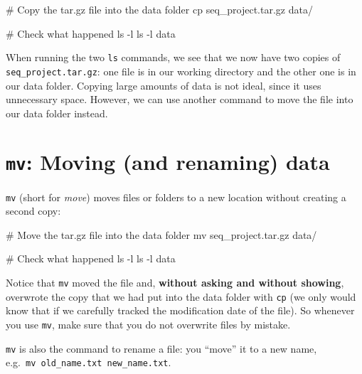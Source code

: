 \documentclass[
  letterpaper,
  DIV=11,
  numbers=noendperiod]{scrreprt}
\newenvironment{Shaded}{}{}
\newcommand{\AttributeTok}[1]{\textcolor[rgb]{0.84,0.23,0.29}{#1}}
\newcommand{\CommentTok}[1]{\textcolor[rgb]{0.42,0.45,0.49}{#1}}
\newcommand{\FunctionTok}[1]{\textcolor[rgb]{0.44,0.26,0.76}{#1}}
\newcommand{\NormalTok}[1]{\textcolor[rgb]{0.14,0.16,0.18}{#1}}
\begin{document}
\begin{Shaded}
\begin{Highlighting}[]
\CommentTok{\# Copy the tar.gz file into the data folder}
\FunctionTok{cp}\NormalTok{ seq\_project.tar.gz data/}

\CommentTok{\# Check what happened}
\FunctionTok{ls} \AttributeTok{{-}l}
\FunctionTok{ls} \AttributeTok{{-}l}\NormalTok{ data}
\end{Highlighting}
\end{Shaded}

When running the two \texttt{ls} commands, we see that we now have two
copies of \texttt{seq\_project.tar.gz}: one file is in our working
directory and the other one is in our data folder. Copying large amounts
of data is not ideal, since it uses unnecessary space. However, we can
use another command to move the file into our data folder instead.

\section{\texorpdfstring{\texttt{mv}: Moving (and renaming)
data}{mv: Moving (and renaming) data}}\label{mv-moving-and-renaming-data}

\texttt{mv} (short for \emph{move}) moves files or folders to a new
location without creating a second copy:

\begin{Shaded}
\begin{Highlighting}[]
\CommentTok{\# Move the tar.gz file into the data folder}
\FunctionTok{mv}\NormalTok{ seq\_project.tar.gz data/}

\CommentTok{\# Check what happened}
\FunctionTok{ls} \AttributeTok{{-}l}
\FunctionTok{ls} \AttributeTok{{-}l}\NormalTok{ data}
\end{Highlighting}
\end{Shaded}

Notice that \texttt{mv} moved the file and, \textbf{without asking and
without showing}, overwrote the copy that we had put into the data
folder with \texttt{cp} (we only would know that if we carefully tracked
the modification date of the file). So whenever you use \texttt{mv},
make sure that you do not overwrite files by mistake.

\texttt{mv} is also the command to rename a file: you ``move'' it to a
new name, e.g.~\texttt{mv\ old\_name.txt\ new\_name.txt}.
\end{document}
